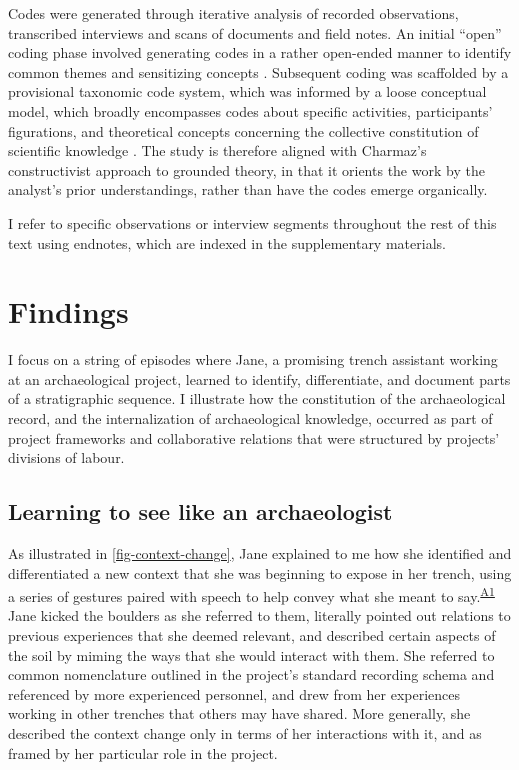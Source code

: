 \documentclass{article}
\begin{document}
Codes were generated through iterative analysis of recorded
observations, transcribed interviews and scans of documents and field
notes. An initial ``open'' coding phase involved generating codes in a
rather open-ended manner to identify common themes and sensitizing
concepts \parencites{bowen2006}[30-31]{charmaz2014}. Subsequent coding was scaffolded by a
provisional taxonomic code system, which was informed by a loose
conceptual model, which broadly encompasses codes about specific
activities, participants' figurations, and theoretical concepts
concerning the collective constitution of scientific knowledge
\parencite[see][Appendix B for an overview of the code
system]{batist2023a}. The study is therefore aligned with Charmaz's
\parencite*{charmaz2000} constructivist approach to grounded theory, in
that it orients the work by the analyst's prior understandings, rather
than have the codes emerge organically.

I refer to specific observations or interview segments throughout the
rest of this text using endnotes, which are indexed in the supplementary
materials.

\section{Findings}
I focus on a string of episodes where Jane, a promising trench assistant
working at an archaeological project, learned to identify,
differentiate, and document parts of a stratigraphic sequence. I
illustrate how the constitution of the archaeological record, and the
internalization of archaeological knowledge, occurred as part of project
frameworks and collaborative relations that were structured by projects'
divisions of labour.

\subsection{Learning to see like an
archaeologist}\label{learning-to-see-like-an-archaeologist}

As illustrated in \autoref{fig-context-change}, Jane explained to me
how she identified and differentiated a new context that she was
beginning to expose in her trench, using a series of gestures paired
with speech to help convey what she meant to
say.\textsuperscript{\hyperref[sec-A1]{A1}} Jane kicked the boulders as
she referred to them, literally pointed out relations to previous
experiences that she deemed relevant, and described certain aspects of
the soil by miming the ways that she would interact with them. She
referred to common nomenclature outlined in the project's standard
recording schema and referenced by more experienced personnel, and drew
from her experiences working in other trenches that others may have
shared. More generally, she described the context change only in terms
of her interactions with it, and as framed by her particular role in the
project.
\end{document}
